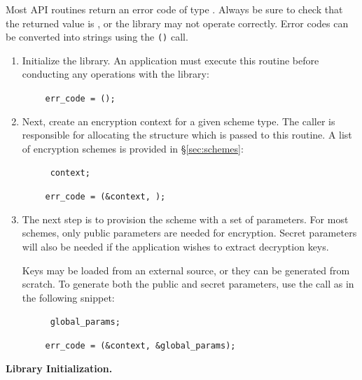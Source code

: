 Most API routines return an error code of type {\tt \fencerror}.  Always be sure to check that the returned value is {\fencerrornone}, or the library may not operate correctly.  Error codes can be converted into strings using the {\tt \libfencerrortostring()} call.

\begin{enumerate}
\item Initialize the {\libraryshort} library.  An application must execute this routine before conducting any operations with the library:

~~~~  {\tt err\_code = \libfencinitialize();} 

\item Next, create an encryption context for a given scheme type.  The caller is responsible for allocating the {\fenccontext} structure which is passed to this routine.  A list of encryption schemes is provided in \S\ref{sec:schemes}:

~~~~ {\tt {\fenccontext} context;} 

~~~~ {\tt err\_code = \libfenccreatecontext(\&context, {\fencschemeLSW});}

\item The next step is to provision the scheme with a set of parameters.  For most schemes, only public parameters are needed for encryption.  Secret parameters will also be needed if the application wishes to extract decryption keys.  

Keys may be loaded from an external source, or they can be generated from scratch.  To generate both the public and secret parameters, use the {\tt \libfencgenparams} call as in the following snippet:

~~~~ {\tt {\fencglobalparams} global\_params;}

~~~~ {\tt err\_code = \libfencgenparams(\&context, \&global\_params);}



\end{enumerate}

\medskip \noindent
{\bf Library Initialization.}   